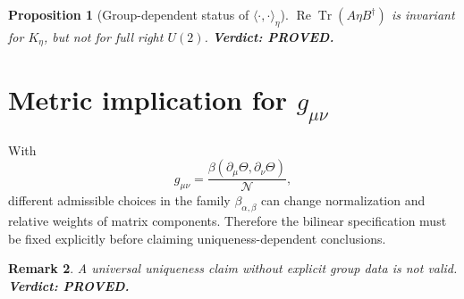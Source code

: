 \documentclass[12pt,a4paper]{article}
\newtheorem{proposition}{Proposition}[section]
\newtheorem{remark}[proposition]{Remark}
\begin{document}
\begin{proposition}[Group-dependent status of $\langle\cdot,\cdot\rangle_\eta$]
$\operatorname{Re}\operatorname{Tr}(A\eta B^\dagger)$ is invariant for $K_\eta$, but not for full right $U(2)$.
\textbf{Verdict: PROVED.}
\end{proposition}

\section{Metric implication for $g_{\mu\nu}$}
With
\[
g_{\mu\nu}=\frac{\beta(\partial_\mu\Theta,\partial_\nu\Theta)}{\mathcal N},
\]
different admissible choices in the family $\beta_{\alpha,\beta}$ can change normalization and relative weights of matrix components.
Therefore the bilinear specification must be fixed explicitly before claiming uniqueness-dependent conclusions.

\begin{remark}
A universal uniqueness claim without explicit group data is not valid.
\textbf{Verdict: PROVED.}
\end{remark}

\ifdefined\INCLUDEMODE
\else
\end{document}
